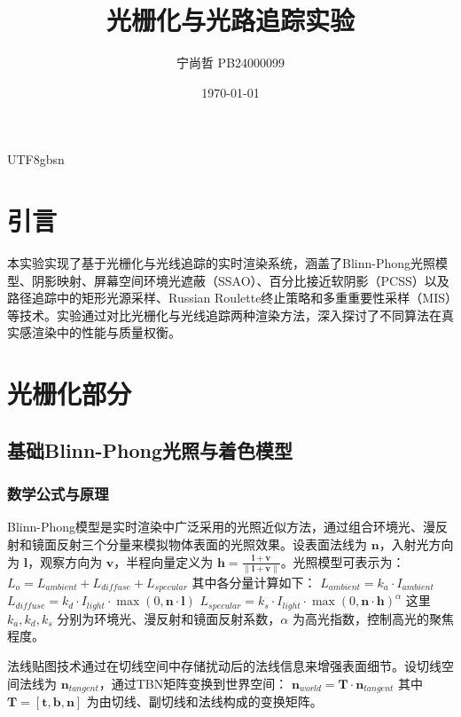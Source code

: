 \documentclass[10pt,a4paper,twocolumn]{article}
\title{光栅化与光路追踪实验}
\author{宁尚哲 \quad PB24000099}
\date{\today}
\begin{document}
\begin{CJK*}{UTF8}{gbsn}
\maketitle

\begin{abstract}

\end{abstract}

\section{引言}
本实验实现了基于光栅化与光线追踪的实时渲染系统，涵盖了Blinn-Phong光照模型、阴影映射、屏幕空间环境光遮蔽（SSAO）、百分比接近软阴影（PCSS）以及路径追踪中的矩形光源采样、Russian Roulette终止策略和多重重要性采样（MIS）等技术。实验通过对比光栅化与光线追踪两种渲染方法，深入探讨了不同算法在真实感渲染中的性能与质量权衡。

\section{光栅化部分}

\subsection{基础Blinn-Phong光照与着色模型}
\subsubsection{数学公式与原理}
Blinn-Phong模型是实时渲染中广泛采用的光照近似方法，通过组合环境光、漫反射和镜面反射三个分量来模拟物体表面的光照效果。设表面法线为 $\mathbf{n}$，入射光方向为 $\mathbf{l}$，观察方向为 $\mathbf{v}$，半程向量定义为 $\mathbf{h}=\frac{\mathbf{l}+\mathbf{v}}{\|\mathbf{l}+\mathbf{v}\|}$。光照模型可表示为：
$
L_o = L_{ambient} + L_{diffuse} + L_{specular}
$
其中各分量计算如下：
$
L_{ambient} = k_a \cdot I_{ambient}
$
$
L_{diffuse} = k_d \cdot I_{light} \cdot \max(0, \mathbf{n} \cdot \mathbf{l})
$
$
L_{specular} = k_s \cdot I_{light} \cdot \max(0, \mathbf{n} \cdot \mathbf{h})^{\alpha}
$
这里 $k_a, k_d, k_s$ 分别为环境光、漫反射和镜面反射系数，$\alpha$ 为高光指数，控制高光的聚焦程度。

法线贴图技术通过在切线空间中存储扰动后的法线信息来增强表面细节。设切线空间法线为 $\mathbf{n}_{tangent}$，通过TBN矩阵变换到世界空间：
$
\mathbf{n}_{world} = \mathbf{T} \cdot \mathbf{n}_{tangent}
$
其中 $\mathbf{T} = [\mathbf{t}, \mathbf{b}, \mathbf{n}]$ 为由切线、副切线和法线构成的变换矩阵。

\end{CJK*}
\end{document}
